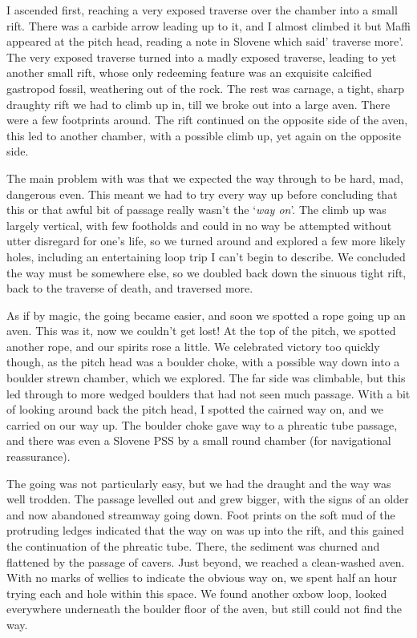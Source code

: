 I ascended first, reaching a very exposed traverse over the chamber into a small rift. There was a carbide arrow leading up to it, and I almost climbed it but Maffi appeared at the pitch head, reading a note in Slovene which said' traverse more'. The very exposed traverse turned into a madly exposed traverse, leading to yet another small rift, whose only redeeming feature was an exquisite calcified gastropod fossil, weathering out of the rock. The rest was carnage, a tight, sharp draughty rift we had to climb up in, till we broke out into a large aven. There were a few footprints around. The rift continued on the opposite side of the aven, this led to another chamber, with a possible climb up, yet again on the opposite side.

The main problem with  was that we expected the way through to be hard, mad, dangerous even. This meant we had to try every way up before concluding that this or that awful bit of passage really wasn't the `\emph{way on}'. The climb up was largely vertical, with few footholds and could in no way be attempted without utter disregard for one's life, so we turned around and explored a few more likely holes, including an entertaining loop trip I can't begin to describe. We concluded the way must be somewhere else, so we doubled back down the sinuous tight rift, back to the traverse of death, and traversed more.

As if by magic, the going became easier, and soon we spotted a rope going up an aven. This was it, now we couldn't get lost! At the top of the pitch, we spotted another rope, and our spirits rose a little. We celebrated victory too quickly though, as the pitch head was a boulder choke, with a possible way down into a boulder strewn  chamber, which we explored. The far side was climbable, but this led through to more wedged boulders that had not seen much passage. With a bit of looking around back the pitch head, I spotted the cairned way on, and we carried on our way up. The boulder choke gave way to a phreatic tube passage, and there was even a Slovene PSS by a small round chamber (for navigational reassurance). 

The going was not particularly easy, but we had the draught and the way was well trodden. The passage levelled out and grew bigger, with the signs of an older and now abandoned streamway going down. Foot prints on the soft mud of the protruding ledges indicated that the way on was up into the rift, and this gained the continuation of the phreatic tube. There, the sediment was churned and flattened by the passage of cavers. Just beyond, we reached a clean-washed aven. With no marks of wellies to indicate the obvious way on, we spent half an hour trying each and hole within this space. We found another oxbow loop, looked everywhere underneath the boulder floor of the aven, but still could not find the way. 

